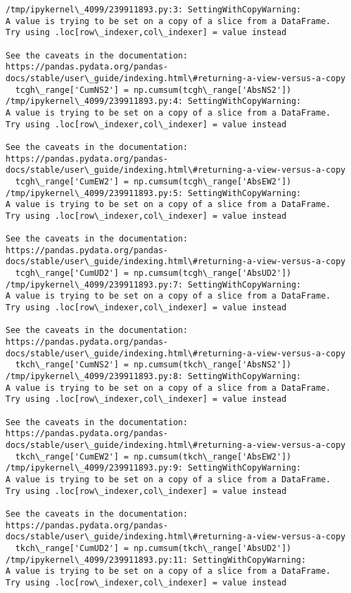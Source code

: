 \documentclass[11pt]{article}
\begin{document}
    \begin{Verbatim}[commandchars=\\\{\}]
/tmp/ipykernel\_4099/239911893.py:3: SettingWithCopyWarning:
A value is trying to be set on a copy of a slice from a DataFrame.
Try using .loc[row\_indexer,col\_indexer] = value instead

See the caveats in the documentation: https://pandas.pydata.org/pandas-
docs/stable/user\_guide/indexing.html\#returning-a-view-versus-a-copy
  tcgh\_range['CumNS2'] = np.cumsum(tcgh\_range['AbsNS2'])
/tmp/ipykernel\_4099/239911893.py:4: SettingWithCopyWarning:
A value is trying to be set on a copy of a slice from a DataFrame.
Try using .loc[row\_indexer,col\_indexer] = value instead

See the caveats in the documentation: https://pandas.pydata.org/pandas-
docs/stable/user\_guide/indexing.html\#returning-a-view-versus-a-copy
  tcgh\_range['CumEW2'] = np.cumsum(tcgh\_range['AbsEW2'])
/tmp/ipykernel\_4099/239911893.py:5: SettingWithCopyWarning:
A value is trying to be set on a copy of a slice from a DataFrame.
Try using .loc[row\_indexer,col\_indexer] = value instead

See the caveats in the documentation: https://pandas.pydata.org/pandas-
docs/stable/user\_guide/indexing.html\#returning-a-view-versus-a-copy
  tcgh\_range['CumUD2'] = np.cumsum(tcgh\_range['AbsUD2'])
/tmp/ipykernel\_4099/239911893.py:7: SettingWithCopyWarning:
A value is trying to be set on a copy of a slice from a DataFrame.
Try using .loc[row\_indexer,col\_indexer] = value instead

See the caveats in the documentation: https://pandas.pydata.org/pandas-
docs/stable/user\_guide/indexing.html\#returning-a-view-versus-a-copy
  tkch\_range['CumNS2'] = np.cumsum(tkch\_range['AbsNS2'])
/tmp/ipykernel\_4099/239911893.py:8: SettingWithCopyWarning:
A value is trying to be set on a copy of a slice from a DataFrame.
Try using .loc[row\_indexer,col\_indexer] = value instead

See the caveats in the documentation: https://pandas.pydata.org/pandas-
docs/stable/user\_guide/indexing.html\#returning-a-view-versus-a-copy
  tkch\_range['CumEW2'] = np.cumsum(tkch\_range['AbsEW2'])
/tmp/ipykernel\_4099/239911893.py:9: SettingWithCopyWarning:
A value is trying to be set on a copy of a slice from a DataFrame.
Try using .loc[row\_indexer,col\_indexer] = value instead

See the caveats in the documentation: https://pandas.pydata.org/pandas-
docs/stable/user\_guide/indexing.html\#returning-a-view-versus-a-copy
  tkch\_range['CumUD2'] = np.cumsum(tkch\_range['AbsUD2'])
/tmp/ipykernel\_4099/239911893.py:11: SettingWithCopyWarning:
A value is trying to be set on a copy of a slice from a DataFrame.
Try using .loc[row\_indexer,col\_indexer] = value instead


\end{Verbatim}
\end{document}
